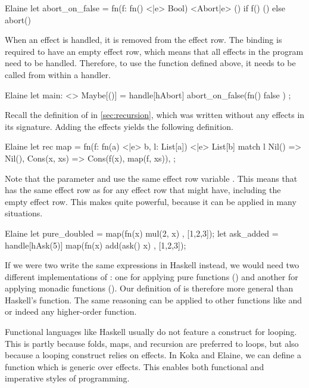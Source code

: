 \begin{lst}{Elaine}
let abort_on_false = fn(f: fn() <|e> Bool) <Abort|e> () {
    if f() { () } else { abort() }
}
\end{lst}
%
When an effect is handled, it is removed from the effect row. The  binding is required to have an empty effect row, which means that all effects in the program need to be handled. Therefore, to use the  function defined above, it needs to be called from within a handler.

\begin{lst}{Elaine}
let main: <> Maybe[()] = handle[hAbort] {
    abort_on_false(fn() { false })
};
\end{lst}

Recall the definition of  in \cref{sec:recursion}, which was written without any effects in its signature. Adding the effects yields the following definition.

\begin{lst}{Elaine}
let rec map = fn(f: fn(a) <|e> b, l: List[a]) <|e> List[b] {
    match l {
        Nil() => Nil(),
        Cons(x, xs) => Cons(f(x), map(f, xs)),
    }
};
\end{lst}
%
Note that the parameter  and  use the same effect row variable . This means that  has the same effect row as  for any effect row that  might have, including the empty effect row. This makes  quite powerful, because it can be applied in many situations.

\begin{lst}{Elaine}
let pure_doubled = map(fn(x) { mul(2, x) }, [1,2,3]);
let ask_added = handle[hAsk(5)] map(fn(x) { add(ask() x) }, [1,2,3]);
\end{lst}
%
If we were two write the same expressions in Haskell instead, we would need two different implementations of : one for applying pure functions () and another for applying monadic functions (). Our definition of  is therefore more general than Haskell's  function. The same reasoning can be applied to other functions like  and  or indeed any higher-order function.

Functional languages like Haskell usually do not feature a construct for looping. This is partly because folds, maps, and recursion are preferred to loops, but also because a looping construct relies on effects. In Koka and Elaine, we can define a  function which is generic over effects. This enables both functional and imperative styles of programming.

